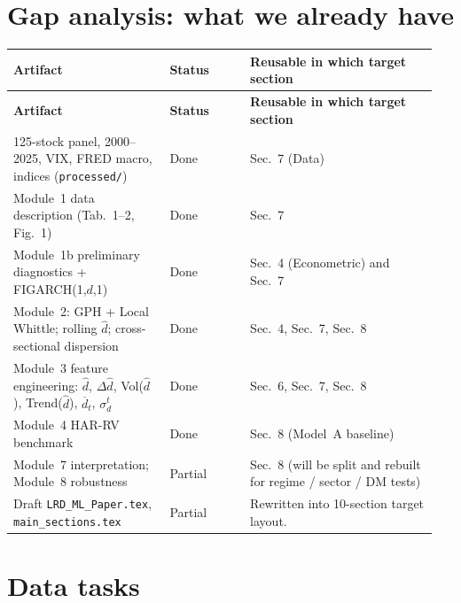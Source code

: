 \documentclass[11pt,a4paper]{article}
\begin{document}
\section{Gap analysis: what we already have}

\begin{longtable}{@{}p{0.35\linewidth}p{0.18\linewidth}p{0.42\linewidth}@{}}
\toprule
\textbf{Artifact} & \textbf{Status} & \textbf{Reusable in which target section} \\
\midrule
\endfirsthead
\toprule
\textbf{Artifact} & \textbf{Status} & \textbf{Reusable in which target section} \\
\midrule
\endhead
125-stock panel, 2000--2025, VIX, FRED macro, indices (\texttt{processed/}) & Done &
Sec.\ 7 (Data) \\
Module~1 data description (Tab.\ 1--2, Fig.\ 1) & Done & Sec.\ 7 \\
Module~1b preliminary diagnostics + FIGARCH(1,$d$,1) & Done &
Sec.\ 4 (Econometric) and Sec.\ 7 \\
Module~2: GPH + Local Whittle; rolling $\hat d$; cross-sectional
dispersion & Done &
Sec.\ 4, Sec.\ 7, Sec.\ 8 \\
Module~3 feature engineering: $\hat d$, $\Delta\hat d$, Vol($\hat d$),
Trend($\hat d$), $\overline{d}_t$, $\sigma_d^t$ & Done &
Sec.\ 6, Sec.\ 7, Sec.\ 8 \\
Module~4 HAR-RV benchmark & Done & Sec.\ 8 (Model~A baseline) \\
Module~7 interpretation; Module~8 robustness & Partial &
Sec.\ 8 (will be split and rebuilt for regime / sector / DM tests) \\
Draft \texttt{LRD\_ML\_Paper.tex}, \texttt{main\_sections.tex} & Partial &
Rewritten into 10-section target layout. \\
\bottomrule
\end{longtable}

\section{Data tasks}\label{sec:data}
\end{document}
